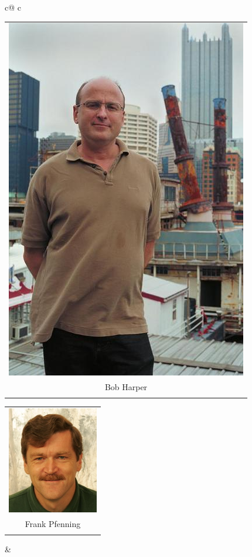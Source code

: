 \documentclass[dvipsnames,14pt,t]{beamer}
\begin{document}
\begin{frame}[c]
\frametitle{}

\begin{tabular}{c@ {\hspace{2mm}}c}
\\[6mm]
\begin{tabular}{c}
\includegraphics[scale=0.11]{pics/harper.jpg}\\[-2mm]
{\footnotesize Bob Harper}\\[-2mm]
{\footnotesize}
\end{tabular}
\begin{tabular}{c}
\includegraphics[scale=0.37]{pics/pfenning.jpg}\\[-2mm]
{\footnotesize Frank Pfenning}\\[-2mm]
{\footnotesize}
\end{tabular} &


\end{tabular}
\end{frame}
\end{document}
